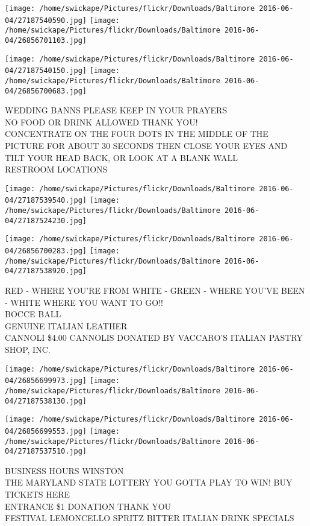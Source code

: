 \documentclass[10pt,letterpaper]{article}
\begin{document}
\texttt{[image: /home/swickape/Pictures/flickr/Downloads/Baltimore 2016-06-04/27187540590.jpg]}
\texttt{[image: /home/swickape/Pictures/flickr/Downloads/Baltimore 2016-06-04/26856701103.jpg]}

\texttt{[image: /home/swickape/Pictures/flickr/Downloads/Baltimore 2016-06-04/27187540150.jpg]}
\texttt{[image: /home/swickape/Pictures/flickr/Downloads/Baltimore 2016-06-04/26856700683.jpg]}

WEDDING BANNS PLEASE KEEP IN YOUR PRAYERS\\
NO FOOD OR DRINK ALLOWED THANK YOU!\\
CONCENTRATE ON THE FOUR DOTS IN THE MIDDLE OF THE PICTURE FOR ABOUT 30 SECONDS THEN CLOSE YOUR EYES AND TILT YOUR HEAD BACK, OR LOOK AT A BLANK WALL\\
RESTROOM LOCATIONS\\
\pagebreak

\texttt{[image: /home/swickape/Pictures/flickr/Downloads/Baltimore 2016-06-04/27187539540.jpg]}
\texttt{[image: /home/swickape/Pictures/flickr/Downloads/Baltimore 2016-06-04/27187524230.jpg]}

\texttt{[image: /home/swickape/Pictures/flickr/Downloads/Baltimore 2016-06-04/26856700283.jpg]}
\texttt{[image: /home/swickape/Pictures/flickr/Downloads/Baltimore 2016-06-04/27187538920.jpg]}

RED {-} WHERE YOU'RE FROM WHITE {-} GREEN {-} WHERE YOU'VE BEEN {-} WHITE WHERE YOU WANT TO GO!!\\
BOCCE BALL\\
GENUINE ITALIAN LEATHER\\
CANNOLI \$4.00 CANNOLIS DONATED BY VACCARO'S ITALIAN PASTRY SHOP, INC.\\
\pagebreak

\texttt{[image: /home/swickape/Pictures/flickr/Downloads/Baltimore 2016-06-04/26856699973.jpg]}
\texttt{[image: /home/swickape/Pictures/flickr/Downloads/Baltimore 2016-06-04/27187538130.jpg]}

\texttt{[image: /home/swickape/Pictures/flickr/Downloads/Baltimore 2016-06-04/26856699553.jpg]}
\texttt{[image: /home/swickape/Pictures/flickr/Downloads/Baltimore 2016-06-04/27187537510.jpg]}

BUSINESS HOURS WINSTON\\
THE MARYLAND STATE LOTTERY YOU GOTTA PLAY TO WIN!  BUY TICKETS HERE\\
ENTRANCE \$1 DONATION THANK YOU\\
FESTIVAL LEMONCELLO SPRITZ BITTER ITALIAN DRINK SPECIALS\\
\pagebreak
\end{document}
